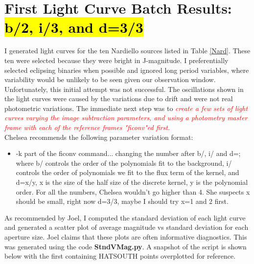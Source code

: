 \documentclass[11pt,letterpaper]{book} %
\begin{document}
\section*{First Light Curve Batch Results: \hl{\textbf{b}/2, \textbf{i}/3, and \textbf{d}=3/3}}
I generated light curves for the ten Nardiello sources listed in Table \ref{Nard}. These ten were selected because they were bright in J-magnitude. I preferentially selected eclipsing binaries when possible and ignored long period variables, where variability would be unlikely to be seen given our observation window. Unfortunately, this initial attempt was not successful. The oscillations shown in the light curves were caused by the variations due to drift and were not real photometric variations. 
The immediate next step was to \textcolor{red}{\textit{create a few sets of light curves varying the image subtraction parameters, and using a photometry master frame with each of the reference frames "ficonv"ed first.}}\\
Chelsea recommends the following parameter variation format:
\begin{itemize}
\item -k part of the ficonv command... changing the number after b/, i/ and d=;\\
where b/ controls the order of the polynomials fit to the background, i/ controls the order of polynomials we fit to the flux term of the kernel, and d=x/y, x is the size of the half size of the discrete kernel, y is the polynomial order. For all the numbers, Chelsea wouldn't go higher than 4.
She suspects x should be small, right now d=3/3, maybe I should try x=1 and 2 first. 
\end{itemize}
As recommended by Joel, I computed the standard deviation of each light curve and generated a scatter plot of average magnitude vs standard deviation for each aperture size. Joel claims that these plots are often informative diagnostics. 
This was generated using the code \textbf{StndVMag.py}. A snapshot of the script is shown below with the first containing HATSOUTH points overplotted for reference. 
\end{document}
